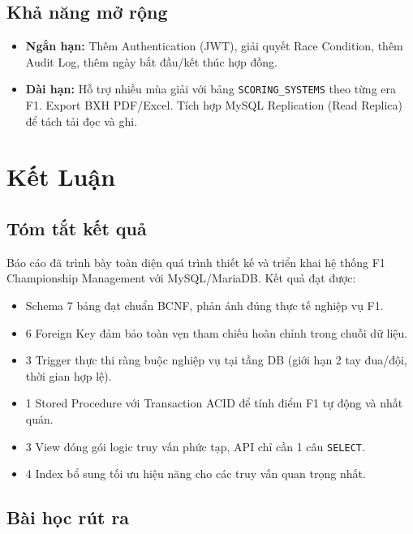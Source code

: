 \documentclass[13pt, a4paper]{report}
\begin{document}
\section{Khả năng mở rộng}

\begin{itemize}[leftmargin=1.5cm]
  \item \textbf{Ngắn hạn:} Thêm Authentication (JWT), giải quyết Race Condition, thêm Audit Log, thêm ngày bắt đầu/kết thúc hợp đồng.
  \item \textbf{Dài hạn:} Hỗ trợ nhiều mùa giải với bảng \texttt{SCORING\_SYSTEMS} theo từng era F1. Export BXH PDF/Excel. Tích hợp MySQL Replication (Read Replica) để tách tải đọc và ghi.
\end{itemize}

\chapter{Kết Luận}

\section{Tóm tắt kết quả}

Báo cáo đã trình bày toàn diện quá trình thiết kế và triển khai hệ thống F1 Championship Management với MySQL/MariaDB. Kết quả đạt được:

\begin{itemize}[leftmargin=1.5cm]
  \item Schema 7 bảng đạt chuẩn BCNF, phản ánh đúng thực tế nghiệp vụ F1.
  \item 6 Foreign Key đảm bảo toàn vẹn tham chiếu hoàn chỉnh trong chuỗi dữ liệu.
  \item 3 Trigger thực thi ràng buộc nghiệp vụ tại tầng DB (giới hạn 2 tay đua/đội, thời gian hợp lệ).
  \item 1 Stored Procedure với Transaction ACID để tính điểm F1 tự động và nhất quán.
  \item 3 View đóng gói logic truy vấn phức tạp, API chỉ cần 1 câu \texttt{SELECT}.
  \item 4 Index bổ sung tối ưu hiệu năng cho các truy vấn quan trọng nhất.
\end{itemize}

\section{Bài học rút ra}
\end{document}
